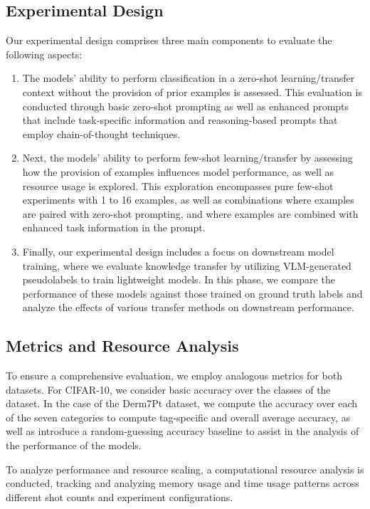 \documentclass[../ShajiS_RnDReport.tex]{subfiles}
\begin{document}
\subsection{Experimental Design}
Our experimental design comprises three main components to evaluate the following aspects:

\begin{enumerate}
    \item The models' ability to perform classification in a zero-shot learning/transfer context without the provision of prior examples is assessed. This evaluation is conducted through basic zero-shot prompting as well as enhanced prompts that include task-specific information and reasoning-based prompts that employ chain-of-thought techniques.
    
    \item Next, the models' ability to perform few-shot learning/transfer by assessing how the provision of examples influences model performance, as well as resource usage is explored. This exploration encompasses pure few-shot experiments with 1 to 16 examples, as well as combinations where examples are paired with zero-shot prompting, and where examples are combined with enhanced task information in the prompt.
    
    \item Finally, our experimental design includes a focus on downstream model training, where we evaluate knowledge transfer by utilizing VLM-generated pseudolabels to train lightweight models. In this phase, we compare the performance of these models against those trained on ground truth labels and analyze the effects of various transfer methods on downstream performance.
\end{enumerate}

\subsection{Metrics and Resource Analysis}
To ensure a comprehensive evaluation, we employ analogous metrics for both datasets. For CIFAR-10, we consider basic accuracy over the classes of the dataset. In the case of the Derm7Pt dataset, we compute the accuracy over each of the seven categories to compute tag-specific and overall average accuracy, as well as introduce a random-guessing accuracy baseline to assist in the analysis of the performance of the models.

To analyze performance and resource scaling, a computational resource analysis is conducted, tracking and analyzing memory usage and time usage patterns across different shot counts and experiment configurations.
\end{document}
